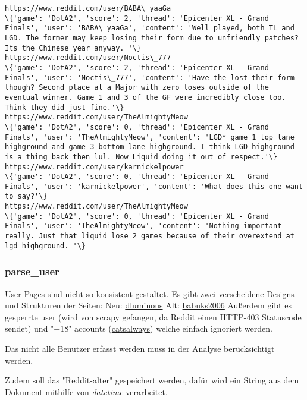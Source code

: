 \documentclass[11pt]{article}
\begin{document}
    \begin{Verbatim}[commandchars=\\\{\}]
https://www.reddit.com/user/BABA\_yaaGa
\{'game': 'DotA2', 'score': 2, 'thread': 'Epicenter XL - Grand Finals', 'user': 'BABA\_yaaGa', 'content': 'Well played, both TL and LGD. The former may keep losing their form due to unfriendly patches? Its the Chinese year anyway. '\}
https://www.reddit.com/user/Noctis\_777
\{'game': 'DotA2', 'score': 2, 'thread': 'Epicenter XL - Grand Finals', 'user': 'Noctis\_777', 'content': 'Have the lost their form though? Second place at a Major with zero loses outside of the eventual winner. Game 1 and 3 of the GF were incredibly close too. Think they did just fine.'\}
https://www.reddit.com/user/TheAlmightyMeow
\{'game': 'DotA2', 'score': 0, 'thread': 'Epicenter XL - Grand Finals', 'user': 'TheAlmightyMeow', 'content': 'LGD* game 1 top lane highground and game 3 bottom lane highground. I think LGD highground is a thing back then lul. Now Liquid doing it out of respect.'\}
https://www.reddit.com/user/karnickelpower
\{'game': 'DotA2', 'score': 0, 'thread': 'Epicenter XL - Grand Finals', 'user': 'karnickelpower', 'content': 'What does this one want to say?'\}
https://www.reddit.com/user/TheAlmightyMeow
\{'game': 'DotA2', 'score': 0, 'thread': 'Epicenter XL - Grand Finals', 'user': 'TheAlmightyMeow', 'content': 'Nothing important really. Just that liquid lose 2 games because of their overextend at lgd highground. '\}

    \end{Verbatim}

    \subsubsection{parse\_user}\label{parse_user}

User-Pages sind nicht so konsistent gestaltet. Es gibt zwei verscheidene
Designs und Strukturen der Seiten: Neu:
\href{https://www.reddit.com/user/dluminous}{dluminous} Alt:
\href{https://www.reddit.com/user/babuks2006}{babuks2006} Außerdem gibt
es gesperrte user (wird von scrapy gefangen, da Reddit einen HTTP-403
Statuscode sendet) und "+18" accounts
(\href{https://www.reddit.com/over18?dest=/user/catsalways}{catsalways})
welche einfach ignoriert werden.

Das nicht alle Benutzer erfasst werden muss in der Analyse
berücksichtigt werden.

Zudem soll das "Reddit-alter" gespeichert werden, dafür wird ein String
aus dem Dokument mithilfe von \emph{datetime} verarbeitet.
\end{document}
